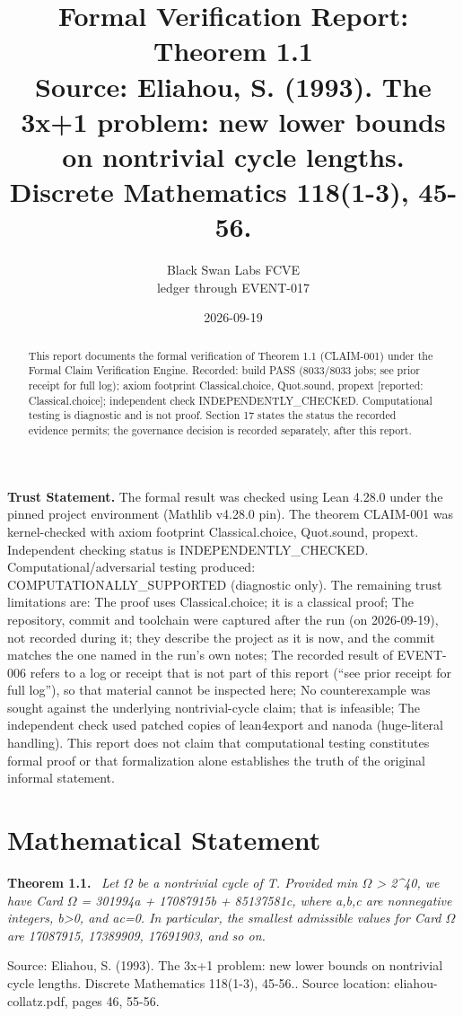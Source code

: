 \documentclass[11pt]{article}
\title{Formal Verification Report: Theorem 1.1\\[0.5em]{\large Source: Eliahou, S. (1993). The 3x+1 problem: new lower bounds on nontrivial cycle lengths. Discrete Mathematics 118(1-3), 45-56.}}
\author{Black Swan Labs FCVE \\ ledger through EVENT-017}
\date{2026-09-19}
\newenvironment{sourceresult}[1]{\par\medskip\noindent\textbf{#1.}\ \itshape}{\par\medskip}
\begin{document}
\maketitle

\noindent\textbf{Trust Statement.} The formal result was checked using Lean 4.28.0 under the pinned project environment (Mathlib v4.28.0 pin). The theorem CLAIM-001 was kernel-checked with axiom footprint Classical.choice, Quot.sound, propext. Independent checking status is INDEPENDENTLY\_CHECKED. Computational/adversarial testing produced: COMPUTATIONALLY\_SUPPORTED (diagnostic only). The remaining trust limitations are: The proof uses Classical.choice; it is a classical proof; The repository, commit and toolchain were captured after the run (on 2026-09-19), not recorded during it; they describe the project as it is now, and the commit matches the one named in the run's own notes; The recorded result of EVENT-006 refers to a log or receipt that is not part of this report (``see prior receipt for full log''), so that material cannot be inspected here; No counterexample was sought against the underlying nontrivial-cycle claim; that is infeasible; The independent check used patched copies of lean4export and nanoda (huge-literal handling). This report does not claim that computational testing constitutes formal proof or that formalization alone establishes the truth of the original informal statement.

\begin{abstract}
This report documents the formal verification of Theorem 1.1 (CLAIM-001) under the Formal Claim Verification Engine. Recorded: build PASS (8033/8033 jobs; see prior receipt for full log); axiom footprint Classical.choice, Quot.sound, propext  [reported: Classical.choice]; independent check INDEPENDENTLY\_CHECKED. Computational testing is diagnostic and is not proof. Section 17 states the status the recorded evidence permits; the governance decision is recorded separately, after this report.
\end{abstract}

\section{Mathematical Statement}
\begin{sourceresult}{Theorem 1.1}
Let \ensuremath{\Omega} be a nontrivial cycle of T. Provided min \ensuremath{\Omega} > 2\textasciicircum{}40, we have Card \ensuremath{\Omega} = 301994a + 17087915b + 85137581c, where a,b,c are nonnegative integers, b>0, and ac=0. In particular, the smallest admissible values for Card \ensuremath{\Omega} are 17087915, 17389909, 17691903, and so on.
\end{sourceresult}
Source: Eliahou, S. (1993). The 3x+1 problem: new lower bounds on nontrivial cycle lengths. Discrete Mathematics 118(1-3), 45-56.. Source location: eliahou-collatz.pdf, pages 46, 55-56.
\end{document}
